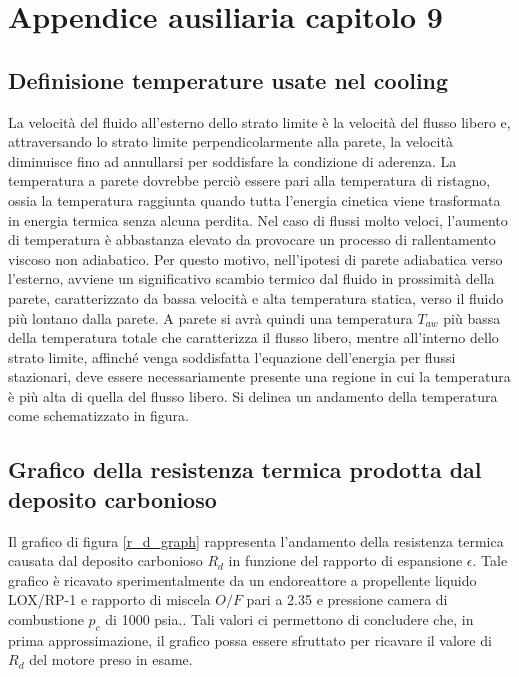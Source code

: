 \section{Appendice ausiliaria capitolo 9}
\label{appendix:cooling_temp_definitions}

\subsection{Definisione temperature usate nel cooling}

La velocità del fluido all'esterno dello strato limite è la velocità del flusso libero e, attraversando lo strato limite perpendicolarmente alla parete, la velocità diminuisce fino ad annullarsi per soddisfare la condizione di aderenza. La temperatura a parete dovrebbe perciò essere pari alla temperatura di ristagno, ossia la temperatura raggiunta quando tutta l'energia cinetica viene trasformata in energia termica senza alcuna perdita. Nel caso di flussi molto veloci, l'aumento di temperatura è abbastanza elevato da provocare un processo di rallentamento viscoso non adiabatico. Per questo motivo, nell'ipotesi di parete adiabatica verso l'esterno, avviene un significativo scambio termico dal fluido in prossimità della parete, caratterizzato da bassa velocità e alta temperatura statica, verso il fluido più lontano dalla parete. A parete si avrà quindi una temperatura $T_{aw}$ più bassa della temperatura totale che caratterizza il flusso libero, mentre all'interno dello strato limite, affinché venga soddisfatta l'equazione dell'energia per flussi stazionari, deve essere necessariamente presente una regione in cui la temperatura è più alta di quella del flusso libero. Si delinea un andamento della temperatura come schematizzato in figura.
\vspace{20pt}

\subsection{Grafico della resistenza termica prodotta dal deposito carbonioso}


Il grafico di figura \autoref{r_d_graph} rappresenta l'andamento della resistenza termica causata dal deposito carbonioso $R_d$ in funzione del rapporto di espansione $\epsilon$. Tale grafico è ricavato sperimentalmente da un endoreattore a propellente liquido LOX/RP-1 e rapporto di miscela $O/F$ pari a 2.35 e pressione camera di combustione $p_c$ di 1000 psia.\cite{AIAA_book_2}. Tali valori ci permettono di concludere che, in prima approssimazione, il grafico possa essere sfruttato per ricavare il valore di $R_d$ del motore preso in esame.

